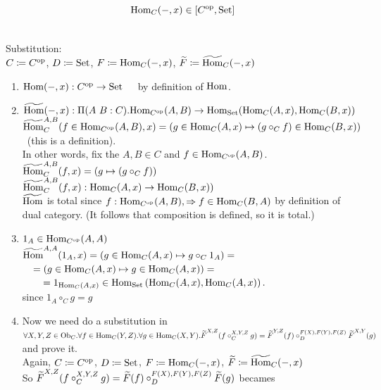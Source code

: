 \documentclass[10pt,a4paper]{article}
\begin{document}
\begin{lemma}
$${\textrm{Hom}}_C(-, x) \in [C^{\textrm{op}},{\textrm{Set}}]$$
\end{lemma}

\myprf\\
Substitution:\\
$C \coloneqq C^{\textrm{op}}$, 
$D \coloneqq {\textrm{Set}}$, 
$F \coloneqq {\textrm{Hom}}_C(-,x)$, 
${\widetilde{F}\textrm{}} \coloneqq {\widetilde{{\textrm{Hom}}}\textrm{}}_C(-,x)$\\
\begin{enumerate}
\item ${\textrm{Hom}}(-, x) : C^{\textrm{op}} \to {\textrm{Set}}$\ \ \ by definition of ${\textrm{Hom}}$.
\item $\HomMor(-, x) :\Pi(A\ B:C).\Hom_{C^\op}(A,B) \to \Hom_\Set(\Hom_C(A,x), \Hom_C(B,x))$\\
${\widetilde{{\textrm{Hom}}}\textrm{}}_C^{A,B}(f\in{\textrm{Hom}}_{C^{\textrm{op}}}(A,B), x) = (g \in{\textrm{Hom}}_C(A,x) \mapsto (g \circ_C f) \in{\textrm{Hom}}_C(B,x))$\ (this is a definition).\\
In other words, fix the $A,B\in C$ and $f\in{\textrm{Hom}}_{C^{\textrm{op}}}(A,B)$.\\
${\widetilde{{\textrm{Hom}}}\textrm{}}_C^{A,B}(f, x) = (g\mapsto (g \circ_C f))$\\
${\widetilde{{\textrm{Hom}}}\textrm{}}_C^{A,B}(f, x) : {\textrm{Hom}}_C(A,x) \to {\textrm{Hom}}_C(B,x))$
\\
${\widetilde{{\textrm{Hom}}}\textrm{}}$ is total since $f:{\textrm{Hom}}_{C^{\textrm{op}}}(A,B), \Rightarrow f\in{\textrm{Hom}}_C(B,A)$ by definition of dual category. (It follows that composition is defined, so it is total.)
\item $1_A\in{\textrm{Hom}}_{C^{\textrm{op}}}(A,A)$\\
${\widetilde{{\textrm{Hom}}}\textrm{}}^{A,A}(1_A, x) = \left(g \in{\textrm{Hom}}_C(A,x)\mapsto g \circ_C 1_A\right) = $\\
$\quad = \left(g \in{\textrm{Hom}}_C(A,x) \mapsto g \in{\textrm{Hom}}_C(A,x)\right) =$\\
$\quad \quad = 1_{{\textrm{Hom}}_C(A,x)} \in {\textrm{Hom}}_{\textrm{Set}}\left({\textrm{Hom}}_C(A,x), {\textrm{Hom}}_C(A,x)\right).$\\
since $1_A \circ_C g = g$\\
\item Now we need do a substitution in
$\forall X,Y,Z \in {\textrm{Ob}}_C.\forall f\in{\textrm{Hom}}_C(Y,Z).\forall g\in{\textrm{Hom}}_C(X,Y). {\widetilde{F}\textrm{}}^{X,Z}(f\circ_C^{X,Y,Z} g)={\widetilde{F}\textrm{}}^{Y,Z}(f)\circ_D^{F(X),F(Y),F(Z)} {\widetilde{F}\textrm{}}^{X,Y}(g)$ and prove it.\\
Again, $C \coloneqq C^{\textrm{op}}$, 
$D \coloneqq {\textrm{Set}}$, 
$F \coloneqq {\textrm{Hom}}_C(-,x)$, 
${\widetilde{F}\textrm{}} \coloneqq {\widetilde{{\textrm{Hom}}}\textrm{}}_C(-,x)$\\
So ${\widetilde{F}\textrm{}}^{X,Z}(f\circ_C^{X,Y,Z} g)={\widetilde{F}\textrm{}}(f)\circ_D^{F(X),F(Y),F(Z)} {\widetilde{F}\textrm{}}(g)$ becames\\

\end{enumerate}
\end{document}
